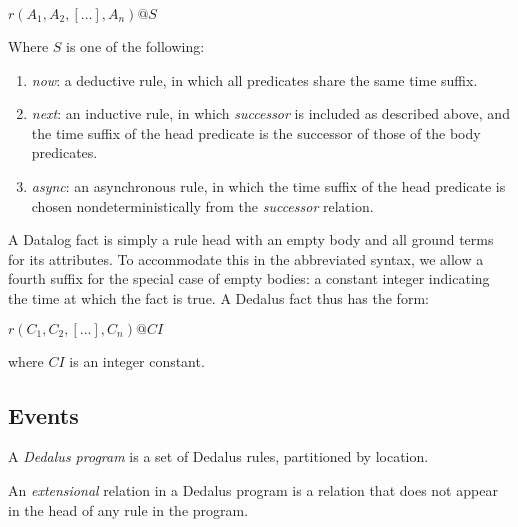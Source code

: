 \documentclass{acm_proc_article-sp-sigmod09}
\newcommand{\wrm}[1]{{\color{BurntOrange}{#1 -- wrm}}}
\begin{document}
$r(A_{1},A_{2},[...],A_{n})@S$

Where $S$ is one of the following:
\begin{enumerate}
\item \emph{now}: a deductive rule, in which all predicates share the same time suffix.
\item \emph{next}: an inductive rule, in which \emph{successor} is included as described above, and the time suffix of the head predicate
is the successor of those of the body predicates. 
\item \emph{async}: an asynchronous rule, in which the time suffix of the head predicate is chosen nondeterministically from the \emph{successor} 
relation.
\end{enumerate}


A Datalog fact is simply a rule head with an empty body and all ground terms for its attributes.  To accommodate this in the abbreviated syntax,
we allow a fourth suffix for the special case of empty bodies: a constant integer indicating the time at which the fact is true.  A Dedalus fact thus has the form:

$r(C_1, C_2, [...], C_n)@CI$

where $CI$ is an integer constant.



\subsection{Events}

\wrm{bunch of random definitions}

 \begin{definition}
%
A {\em Dedalus program} is a set of Dedalus rules, partitioned by location.
%
\end{definition}

\begin{definition} 
%
An \emph{extensional} relation in a Dedalus program is a relation that does not
appear in the head of any rule in the program.
%
\end{definition}
\end{document}
